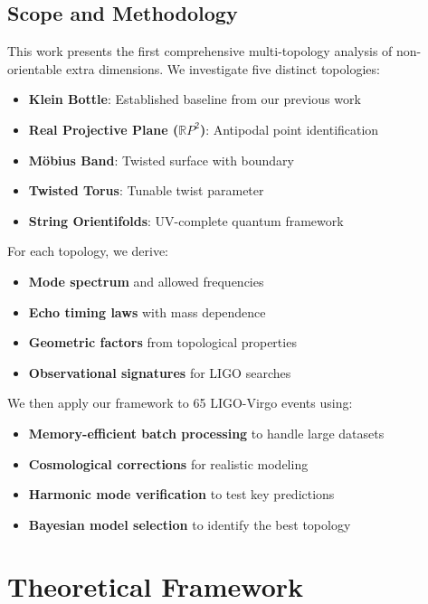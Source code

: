 \documentclass[11pt,a4paper]{article}
\begin{document}
\subsection{Scope and Methodology}

This work presents the first comprehensive multi-topology analysis of non-orientable extra dimensions. We investigate five distinct topologies:

\begin{itemize}
    \item \textbf{Klein Bottle}: Established baseline from our previous work \cite{dibacco2025}
    \item \textbf{Real Projective Plane ($\mathbb{R}P^2$)}: Antipodal point identification
    \item \textbf{Möbius Band}: Twisted surface with boundary
    \item \textbf{Twisted Torus}: Tunable twist parameter
    \item \textbf{String Orientifolds}: UV-complete quantum framework
\end{itemize}

For each topology, we derive:
\begin{itemize}
    \item \textbf{Mode spectrum} and allowed frequencies
    \item \textbf{Echo timing laws} with mass dependence
    \item \textbf{Geometric factors} from topological properties
    \item \textbf{Observational signatures} for LIGO searches
\end{itemize}

We then apply our framework to 65 LIGO-Virgo events using:
\begin{itemize}
    \item \textbf{Memory-efficient batch processing} to handle large datasets
    \item \textbf{Cosmological corrections} for realistic modeling
    \item \textbf{Harmonic mode verification} to test key predictions
    \item \textbf{Bayesian model selection} to identify the best topology
\end{itemize}

\section{Theoretical Framework}
\end{document}

